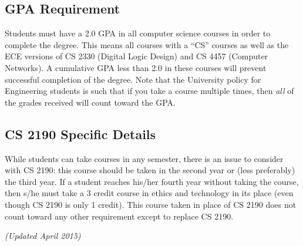 
\subsection{GPA Requirement}

Students must have a 2.0 GPA in all computer science courses in order to complete the degree.  This means all courses with a ``CS'' courses as well as the ECE versions of CS 2330 (Digital Logic Design) and CS 4457 (Computer Networks).  A cumulative GPA less than 2.0 in these courses will prevent successful completion of the degree.  Note that the University policy for Engineering students is such that if you take a course multiple times, then {\em all} of the grades received will count toward the GPA.

\subsection{CS 2190 Specific Details}

While students can take courses in any semester, there is an issue to
consider with CS 2190: this course should be taken in the second year
or (less preferably) the third year. If a student reaches his/her
fourth year without taking the course, then s/he must take a 3 credit
course in ethics and technology in its place (even though CS 2190 is
only 1 credit). This course taken in place of CS 2190 does not count
toward any other requirement except to replace CS 2190.

\clearpage%
\begin{figure*}[h!]
{\em (Updated April 2015)}
\begin{center}
\end{center}
\end{figure*}
